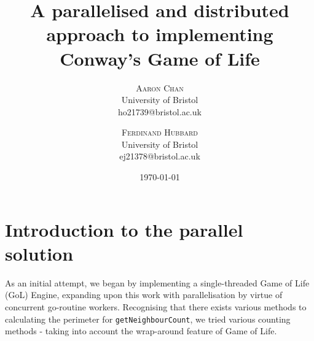 \documentclass[twoside,twocolumn]{article}
\title{A parallelised and distributed approach to implementing Conway's Game of Life} %
\author{%
\textsc{Aaron Chan}\\[1ex] %
\normalsize University of Bristol \\ %
\normalsize {ho21739@bristol.ac.uk} %
\and %
\textsc{Ferdinand Hubbard}\\[1ex] %
\normalsize University of Bristol \\ %
\normalsize {ej21378@bristol.ac.uk} %
}
\date{\today} %
\begin{document}
\maketitle

\section{Introduction to the parallel solution}

As an initial attempt, we began by implementing a 
single-threaded Game of Life (GoL) Engine, expanding upon this work 
with parallelisation by virtue of concurrent go-routine workers. 
Recognising that there exists various methods to calculating the perimeter
for \texttt{getNeighbourCount}, we tried various counting methods - taking into 
account the wrap-around feature of Game of Life.

\end{document}
